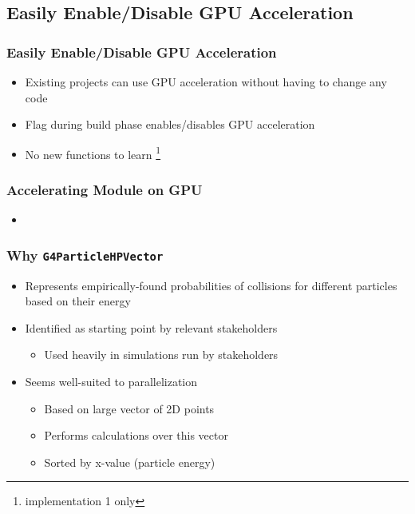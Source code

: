 \documentclass{beamer}
\begin{document}
\subsection{Easily Enable/Disable GPU Acceleration}
\begin{frame}
\frametitle{Easily Enable/Disable GPU Acceleration}
\begin{itemize}
\item Existing projects can use GPU acceleration without having to change any code 
\item Flag during build phase enables/disables GPU acceleration
\item No new functions to learn \footnote{implementation 1 only}
\end{itemize}
\end{frame}

\begin{frame}
\frametitle{Accelerating Module on GPU}
\begin{itemize}
\item
\end{itemize}
\end{frame}

\begin{frame}
\frametitle{Why \texttt{G4ParticleHPVector}}
\begin{itemize}
\item Represents empirically-found probabilities of collisions for different particles based on their energy
\item Identified as starting point by relevant stakeholders
\begin{itemize}
\item Used heavily in simulations run by stakeholders
\end{itemize}
\item Seems well-suited to parallelization
\begin{itemize}
\item Based on large vector of 2D points
\item Performs calculations over this vector
\item Sorted by x-value (particle energy)
\end{itemize}
\end{itemize}
\end{frame}
\end{document}
